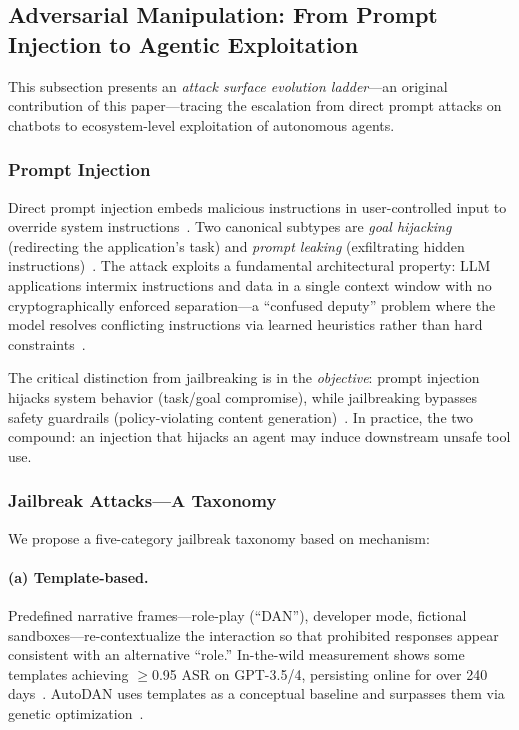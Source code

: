 \subsection{Adversarial Manipulation: From Prompt Injection to Agentic Exploitation}
\label{sec:threat-adversarial}

This subsection presents an \emph{attack surface evolution ladder}---an original contribution of this paper---tracing the escalation from direct prompt attacks on chatbots to ecosystem-level exploitation of autonomous agents.

\subsubsection{Prompt Injection}
\label{sec:threat-pi}

Direct prompt injection embeds malicious instructions in user-controlled input to override system instructions~\cite{perez2022ignore}. Two canonical subtypes are \emph{goal hijacking} (redirecting the application's task) and \emph{prompt leaking} (exfiltrating hidden instructions)~\cite{perez2022ignore}. The attack exploits a fundamental architectural property: LLM applications intermix instructions and data in a single context window with no cryptographically enforced separation---a ``confused deputy'' problem where the model resolves conflicting instructions via learned heuristics rather than hard constraints~\cite{greshake2023ipi}.

The critical distinction from jailbreaking is in the \emph{objective}: prompt injection hijacks system behavior (task/goal compromise), while jailbreaking bypasses safety guardrails (policy-violating content generation)~\cite{perez2022ignore,chao2024jailbreakbench}. In practice, the two compound: an injection that hijacks an agent may induce downstream unsafe tool use.


\subsubsection{Jailbreak Attacks---A Taxonomy}
\label{sec:threat-jailbreak}

We propose a five-category jailbreak taxonomy based on mechanism:

\paragraph{(a) Template-based.}
Predefined narrative frames---role-play (``DAN''), developer mode, fictional sandboxes---re-contextualize the interaction so that prohibited responses appear consistent with an alternative ``role.'' In-the-wild measurement shows some templates achieving $\geq$0.95 ASR on GPT-3.5/4, persisting online for over 240 days~\cite{zhang2024dananything}. AutoDAN uses templates as a conceptual baseline and surpasses them via genetic optimization~\cite{liu2024autodan}.

